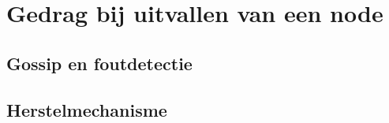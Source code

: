 \chapter{Gedrag bij uitvallen van een node}
\label{ch:cassandra_uitval}

\section{Gossip en foutdetectie}
\section{Herstelmechanisme}
